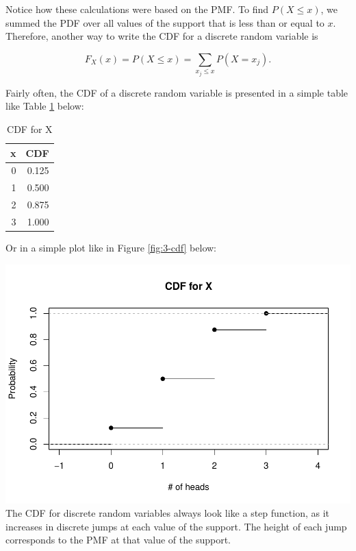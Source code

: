 \documentclass[
]{book}
\begin{document}
Notice how these calculations were based on the PMF. To find \(P(X \leq x)\), we summed the PDF over all values of the support that is less than or equal to \(x\). Therefore, another way to write the CDF for a discrete random variable is

\begin{equation} 
F_X(x) = P(X \leq x) = \sum_{x_j \leq x} P(X=x_j).
\label{eq:3-CDF}
\end{equation}

Fairly often, the CDF of a discrete random variable is presented in a simple table like Table \ref{tab:3-cdf-tab} below:

\begin{table}

\caption{\label{tab:3-cdf-tab}CDF for X}
\centering
\begin{tabular}[t]{r|r}
\hline
x & CDF\\
\hline
0 & 0.125\\
\hline
1 & 0.500\\
\hline
2 & 0.875\\
\hline
3 & 1.000\\
\hline
\end{tabular}
\end{table}

Or in a simple plot like in Figure \ref{fig:3-cdf} below:

\includegraphics{bookdown-demo_files/figure-latex/3-cdf-1.pdf}
The CDF for discrete random variables always look like a step function, as it increases in discrete jumps at each value of the support. The height of each jump corresponds to the PMF at that value of the support.
\end{document}

